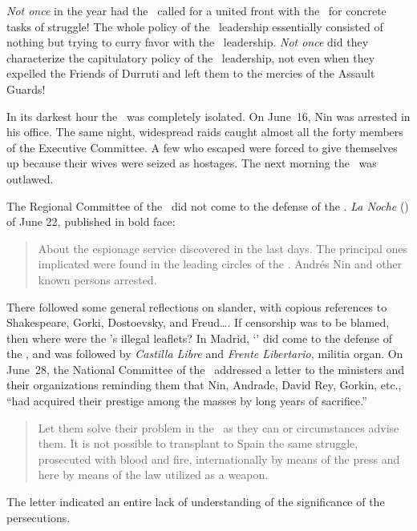 \emph{Not once} in the year had the \POUM\ called for a united front with the \CNT\ for concrete tasks of struggle! The whole policy of the \POUM\ leadership essentially consisted of nothing but trying to curry favor with the \CNT\ leadership. \emph{Not once} did they characterize the capitulatory policy of the \CNT\ leadership, not even when they expelled the Friends of Durruti and left them to the mercies of the Assault Guards!

In its darkest hour the \POUM\ was completely isolated. On June~16, Nin{\indexANin} was arrested in his office. The same night, widespread raids caught almost all the forty members of the Executive Committee. A few who escaped were forced to give themselves up because their wives were seized as hostages. The next morning the \POUM\ was outlawed.

The Regional Committee of the \CNT\ did not come to the defense of the \POUM\kn. \emph{La Noche} (\CNT) of June 22, published in bold face:

\begin{quotation}
  About the espionage service discovered in the last days. The principal ones implicated were found in the leading circles of the \POUM. Andr\'es Nin and other known persons arrested.
\end{quotation}

There followed some general reflections on slander, with copious references to Shakespeare, Gorki, Dostoevsky, and Freud\dots. If censorship was to be blamed, then where were the \CNT’s illegal leaflets? In Madrid, `\CNT' did come to the defense of the \POUM\kn, and was followed by \emph{Castilla Libre} and \emph{Frente Libertario,} militia organ. On June~28, the National Committee of the \CNT\ addressed a letter to the ministers and their organizations reminding them that Nin, Andrade, David Rey, Gorkin, etc., ``had acquired their prestige among the masses by long years of sacrifice.\kn\kn''

\begin{quotation}
  Let them solve their problem in the \USSR\ as they can or circumstances advise them. It is not possible to transplant to Spain the same struggle, prosecuted with blood and fire, internationally by means of the press and here by means of the law utilized as a weapon.
\end{quotation}

The letter indicated an entire lack of understanding of the significance of the persecutions.

